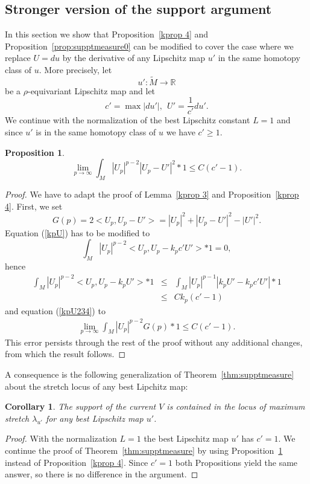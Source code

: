 \documentclass{ip-journal}
\newtheorem{proposition}[theorem]{Proposition}
\newtheorem{corollary}[theorem]{Corollary}
\theoremstyle{definition}
\numberwithin{equation}{section}
\newcommand{\R}{\mathbb R}
\begin{document}
\subsection{Stronger version of the support argument} In this section we show that  Proposition~\ref{kprop 4} and Proposition~\ref{prop:supptmeasure0} can be modified to cover the case where we replace $U=du$ by the derivative of any Lipschitz map $u'$ in the same homotopy class of $u$.
More precisely, let
\[
u': \tilde M \rightarrow \R
\]
be a $\rho$-equivariant  Lipschitz map and let 
\[
c'=\max |du'|, \  \ U'=\frac{1}{c'} du'.
\]
We continue with the normalization of the best Lipschitz constant $L = 1$ and since $u'$ is in the same homotopy class of $u$ we have $c' \geq 1$.
\begin{proposition} \label{kprop 4*}  
\[
\lim_{p\rightarrow \infty}\int_M |U_p|^{p-2}|U_p - U'|^2 *1 \leq C (c'-1).
\]
\end{proposition}
\begin{proof} We have to adapt the proof of Lemma~\ref{kprop 3} and Proposition~\ref{kprop 4}. First, we set
\[ 
G(p) =  2<U_p ,U_p -U'> =|U_p|^2+ |U_p -U'|^2 - |U'|^2.
\]
Equation (\ref{kpU}) has to be modified to
\begin{equation*}
\int_M |U_p|^{p-2}<U_p, U_p - k_pc'U'>*1 = 0,
\end{equation*}
hence
\begin{eqnarray*}\label{kpUc}
\int_M |U_p|^{p-2}<U_p, U_p - k_pU'>*1 &\leq& \int_M |U_p|^{p-1}| k_pU' - k_pc'U'|*1 \\
&\leq& Ck_p (c'-1)
\end{eqnarray*}
and equation (\ref{kpU234}) to
\begin{eqnarray}\label{kpU234c}
\lim_{p\rightarrow \infty} \int_M |U_p|^{p-2}G(p)*1 \leq C (c'-1).
\end{eqnarray} 
This  error persists through the rest of the proof without any additional changes, from which the result follows.
\end{proof}

A  consequence is the following generalization of Theorem~\ref{thm:supptmeasure} about the stretch locus of any best Lipchitz map:
\begin{corollary}\label{strsuppp}
 The support of the current $V$  is contained in the locus of maximum stretch $ \lambda_{u'}$ for any best Lipschitz map $u'$.
\end{corollary}
\begin{proof}With the normalization $L=1$ the best Lipschitz map $u'$ has $c'=1$. We continue the proof of Theorem~\ref{thm:supptmeasure} by using 
Proposition~\ref{kprop 4*} instead of Proposition~\ref{kprop 4}. Since $c'=1$ both Propositions yield the same answer, so there is no difference in the argument.
 \end{proof}
 
\end{document}
